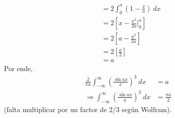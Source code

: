 \documentclass[12pt]{report}
\theoremstyle{largebreak}
\begin{document}
\begin{sol}
\begin{equation*}
\begin{split}
                &=2\int_{0}^a \left(1-\frac{x}{a}\right)\:dx\\
                &=2\left[x-\frac{x^2}{2a}\Big|_{ 0}^a\right]\\
                &=2\left[a-\frac{a^2}{2a}\right]\\
                &=2\left[\frac{a}{2}\right]\\
                &=a
            \end{split}
        \end{equation*}
        Por ende,
        \begin{equation*}
            \begin{split}
                \frac{2}{\pi a}\int_{-\infty}^{\infty}\left(\frac{\sin ax}{x}\right)^3\:dx&=a\\
                \Rightarrow \int_{-\infty}^{\infty}\left(\frac{\sin ax}{x}\right)^3\:dx&=\frac{\pi a}{2}
            \end{split}
        \end{equation*}
        (falta multiplicar por un factor de 2/3 según Wolfram).
    \end{sol}
\end{document}

